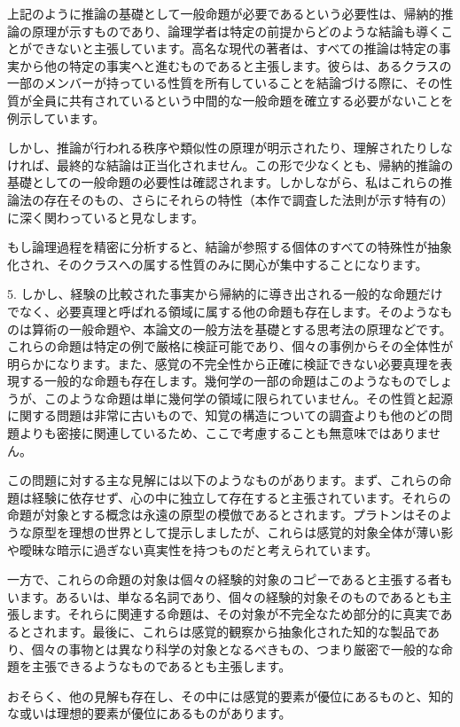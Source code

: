 \documentclass[a4paper,11pt,openany]{ltjsbook}
\begin{document}
上記のように推論の基礎として一般命題が必要であるという必要性は、帰納的推論の原理が示すものであり、論理学者は特定の前提からどのような結論も導くことができないと主張しています。高名な現代の著者は、すべての推論は特定の事実から他の特定の事実へと進むものであると主張します。彼らは、あるクラスの一部のメンバーが持っている性質を所有していることを結論づける際に、その性質が全員に共有されているという中間的な一般命題を確立する必要がないことを例示しています。

しかし、推論が行われる秩序や類似性の原理が明示されたり、理解されたりしなければ、最終的な結論は正当化されません。この形で少なくとも、帰納的推論の基礎としての一般命題の必要性は確認されます。しかしながら、私はこれらの推論法の存在そのもの、さらにそれらの特性（本作で調査した法則が示す特有の）に深く関わっていると見なします。

もし論理過程を精密に分析すると、結論が参照する個体のすべての特殊性が抽象化され、そのクラスへの属する性質のみに関心が集中することになります。

5. しかし、経験の比較された事実から帰納的に導き出される一般的な命題だけでなく、必要真理と呼ばれる領域に属する他の命題も存在します。そのようなものは算術の一般命題や、本論文の一般方法を基礎とする思考法の原理などです。これらの命題は特定の例で厳格に検証可能であり、個々の事例からその全体性が明らかになります。また、感覚の不完全性から正確に検証できない必要真理を表現する一般的な命題も存在します。幾何学の一部の命題はこのようなものでしょうが、このような命題は単に幾何学の領域に限られていません。その性質と起源に関する問題は非常に古いもので、知覚の構造についての調査よりも他のどの問題よりも密接に関連しているため、ここで考慮することも無意味ではありません。

この問題に対する主な見解には以下のようなものがあります。まず、これらの命題は経験に依存せず、心の中に独立して存在すると主張されています。それらの命題が対象とする概念は永遠の原型の模倣であるとされます。プラトンはそのような原型を理想の世界として提示しましたが、これらは感覚的対象全体が薄い影や曖昧な暗示に過ぎない真実性を持つものだと考えられています。

一方で、これらの命題の対象は個々の経験的対象のコピーであると主張する者もいます。あるいは、単なる名詞であり、個々の経験的対象そのものであるとも主張します。それらに関連する命題は、その対象が不完全なため部分的に真実であるとされます。最後に、これらは感覚的観察から抽象化された知的な製品であり、個々の事物とは異なり科学の対象となるべきもの、つまり厳密で一般的な命題を主張できるようなものであるとも主張します。

おそらく、他の見解も存在し、その中には感覚的要素が優位にあるものと、知的な或いは理想的要素が優位にあるものがあります。
\end{document}
